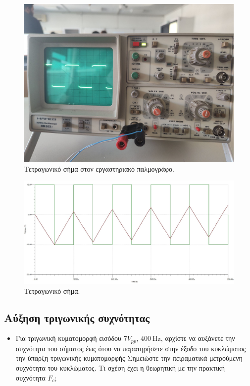 \documentclass[12pt]{article}
\begin{document}
\begin{figure}[H]
	\centering
	\includegraphics[width=\linewidth]{./res/square_real.jpg}
	\caption{Τετραγωνικό σήμα στον εργαστηριακό παλμογράφο.}
\end{figure}

\begin{figure}[H]
	\centering
	\includegraphics[width=\linewidth]{./res/square.jpg}
	\caption{Τετραγωνικό σήμα.}
\end{figure}

\subsection{Αύξηση τριγωνικής συχνότητας}

\begin{itemize}
	\item Για τριγωνική κυματομορφή εισόδου $7V_{pp}$, $\SI{400}{\hertz}$,
		αρχίστε να αυξάνετε την συχνότητα του σήματος έως ότου να
		παρατηρήσετε στην έξοδο του κυκλώματος την ύπαρξη τριγωνικής
		κυματομορφής Σημειώστε την πειραματικά μετρούμενη συχνότητα του
		κυκλώματος. Τι σχέση έχει η θεωρητική με την πρακτική συχνότητα
		$F_c$;
\end{itemize}
\end{document}
